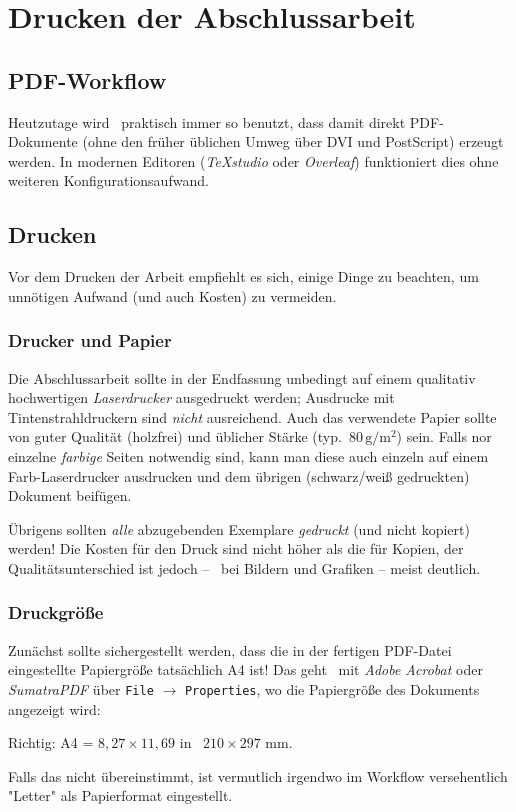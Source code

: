 \chapter{Drucken der Abschlussarbeit}
\label{cha:Drucken}


\section{PDF-Workflow}
\label{sec:pdf}

Heutzutage wird \latex\ praktisch immer so benutzt, dass damit direkt
PDF-Dokumente (ohne den früher üblichen Umweg über DVI und PostScript) erzeugt werden.
In modernen Editoren (\zB \emph{TeXstudio} oder \emph{Overleaf}) funktioniert dies ohne
weiteren Konfigurationsaufwand.


\section{Drucken}

Vor dem Drucken der Arbeit empfiehlt es sich, einige Dinge zu beachten, um
unnötigen Aufwand (und auch Kosten) zu vermeiden.

\subsection{Drucker und Papier}

Die Abschlussarbeit sollte in der Endfassung unbedingt auf einem qualitativ
hochwertigen \emph{Laserdrucker} ausgedruckt werden; Ausdrucke mit
Tintenstrahldruckern sind \emph{nicht} ausreichend. Auch das verwendete
Papier sollte von guter Qualität (holzfrei) und üblicher Stärke (typ.\  
$80\,\mathrm{g} / \mathrm{m}^2$) sein. Falls nor einzelne \emph{farbige} Seiten 
notwendig sind, kann man diese auch einzeln auf einem Farb-Laserdrucker ausdrucken
und dem übrigen (schwarz/weiß gedruckten) Dokument beifügen.

Übrigens sollten \emph{alle} abzugebenden Exemplare \emph{gedruckt} (und
nicht kopiert) werden! Die Kosten für den Druck sind nicht höher als die für
Kopien, der Qualitätsunterschied ist jedoch -- \va\ bei Bildern und Grafiken
-- meist deutlich.

\subsection{Druckgröße}

Zunächst sollte sichergestellt werden, dass die in der fertigen PDF-Datei
eingestellte Papiergröße tatsächlich \textrm{A4} ist! Das geht \zB\ mit
\emph{Adobe Acrobat} oder \emph{SumatraPDF} über \texttt{File} $\rightarrow$
\texttt{Properties}, wo die Papiergröße des Dokuments angezeigt wird:
\begin{center}
	\textrm{Richtig:} A4 = $8{,}27 \times 11{,}69$ in \bzw\ $210 \times 297$ mm.
\end{center}
Falls das nicht übereinstimmt, ist vermutlich irgendwo im Workflow versehentlich
"Letter" als Papierformat eingestellt.


